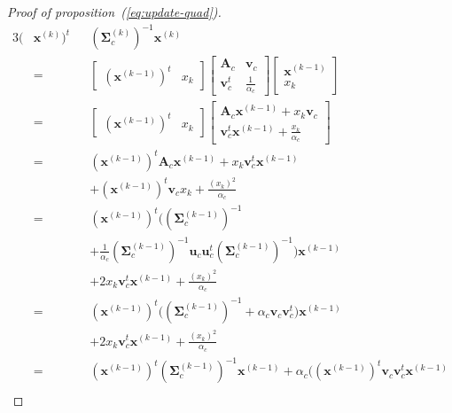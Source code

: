 \documentclass[journal,10pt]{IEEEtran}
\begin{document}
\begin{proof}[Proof of proposition~(\ref{eq:update-quad})]
    \begin{alignat*}{3}
    (&\mathbf{x}^{(k)})^t && (\boldsymbol{\Sigma}^{(k)}_c)^{-1} \mathbf{x}^{(k)} \\
     &= &&\left[\begin{array}{cc} (\mathbf{x}^{(k-1)})^t   & x_k \end{array}\right]
        \left[\begin{array}{cc}
            \mathbf{A}_c   & \mathbf{v}_c \\
            \mathbf{v}_c^t & \frac{1}{\alpha_c}
        \end{array}\right]
        \left[\begin{array}{c} \mathbf{x}^{(k-1)} \\ x_k \end{array}\right] \\
     &= &&\left[\begin{array}{cc} (\mathbf{x}^{(k-1)})^t   & x_k \end{array}\right]
            \left[\begin{array}{c} \mathbf{A}_c \mathbf{x}^{(k-1)} + x_k \mathbf{v}_c \\ \mathbf{v}_c^t \mathbf{x}^{(k-1)} + \frac{x_k}{\alpha_c} \end{array}\right] \\
     &= &&(\mathbf{x}^{(k-1)})^t \mathbf{A}_c \mathbf{x}^{(k-1)} + x_k \mathbf{v}_c^t \mathbf{x}^{(k-1)} \\
     & &&+ (\mathbf{x}^{(k-1)})^t \mathbf{v}_c x_k + \frac{(x_k)^2}{\alpha_c} \\
     &= &&(\mathbf{x}^{(k-1)})^t \Big((\boldsymbol{\Sigma}_c^{(k-1)})^{-1} \\
     & &&+ \frac{1}{\alpha_c} (\boldsymbol{\Sigma}_c^{(k-1)})^{-1} \mathbf{u}_c \mathbf{u}_c^t (\boldsymbol{\Sigma}_c^{(k-1)})^{-1}\Big) \mathbf{x}^{(k-1)}\\
     & &&+ 2 x_k \mathbf{v}_c^t \mathbf{x}^{(k-1)} + \frac{(x_k)^2}{\alpha_c} \\
     &= &&(\mathbf{x}^{(k-1)})^t \Big((\boldsymbol{\Sigma}_c^{(k-1)})^{-1} + \alpha_c \mathbf{v}_c \mathbf{v}_c^t\Big) \mathbf{x}^{(k-1)}\\
     & &&+ 2 x_k \mathbf{v}_c^t \mathbf{x}^{(k-1)} + \frac{(x_k)^2}{\alpha_c} \\
     &= &&(\mathbf{x}^{(k-1)})^t (\boldsymbol{\Sigma}_c^{(k-1)})^{-1} \mathbf{x}^{(k-1)} + \alpha_c \Big( (\mathbf{x}^{(k-1)})^t \mathbf{v}_c \mathbf{v}_c^t \mathbf{x}^{(k-1)} \\

\end{alignat*}
\end{proof}
\end{document}
